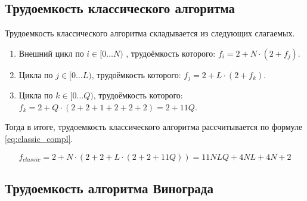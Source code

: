 \subsection{Трудоемкость классического алгоритма}

Трудоемкость классического алгоритма складывается из следующих слагаемых.
\begin{enumerate}
	\item Внешний цикл по $i \in [0 \ldots N)$ , трудоёмкость которого: $f_{i} = 2 + N \cdot (2 + f_{j})$.
	\item Цикла по $j \in [0 \ldots L)$, трудоёмкость которого: $f_{j} = 2 + L \cdot (2 + f_{k})$.
	\item Цикла по $k \in [0 \ldots Q)$, трудоёмкость которого: $f_{k} = 2 + Q \cdot (2 + 2 + 1 + 2 + 2 + 2) = 2 + 11Q$.
\end{enumerate}

\clearpage

Тогда в итоге, трудоемкость классического алгоритма рассчитывается по формуле \eqref{eq:classic_compl}.

\begin{equation}
	\label{eq:classic_compl}
	f_{classic} = 2 + N \cdot (2 + 2 + L \cdot (2 + 2 + 11Q)) = 11NLQ + 4NL + 4N + 2
\end{equation}

\subsection{Трудоемкость алгоритма Винограда}

